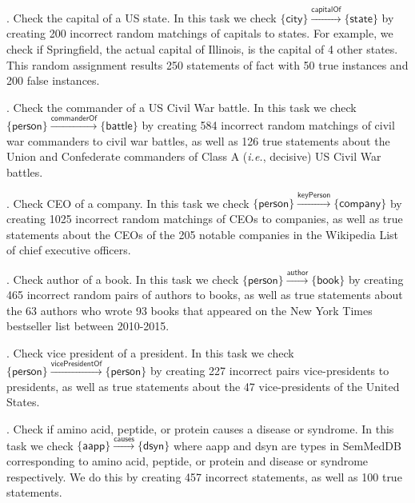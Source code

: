 \documentclass[reprint,twocolumn,showpacs,preprintnumbers,amsmath, aps,pre,amssymb]{revtex4-1}
\newcommand\ie{\emph{i.e.}}
\begin{document}
\vspace{5pt}. Check the capital of a US state. In this task we check $\{\textsf{city}\}\xrightarrow{\textsf{capitalOf}}\{\textsf{state}\}$ by creating 200 incorrect random matchings of capitals to states. For example, we check if Springfield, the actual capital of Illinois, is the capital of 4 other states. This random assignment results 250 statements of fact with 50 true instances and 200 false instances.

\vspace{5pt}. Check the commander of a US Civil War battle. In this task we check $\{\textsf{person}\}\xrightarrow{\textsf{commanderOf}}\{\textsf{battle}\}$ by creating 584 incorrect random matchings of civil war commanders to civil war battles, as well as 126 true statements about the Union and Confederate commanders of Class A (\ie, decisive) US Civil War battles. 

\vspace{5pt}. Check CEO of a company. In this task we check $\{\textsf{person}\}\xrightarrow{\textsf{keyPerson}}\{\textsf{company}\}$ by creating 1025 incorrect random matchings of CEOs to companies, as well as true statements about the CEOs of the 205 notable companies in the Wikipedia \textsf{List of chief executive officers}. 

\vspace{5pt}. Check author of a book. In this task we check $\{\textsf{person}\}\xrightarrow{\textsf{author}}\{\textsf{book}\}$ by creating 465 incorrect random pairs of authors to books, as well as true statements about the 63 authors who wrote 93 books that appeared on the New York Times bestseller list between 2010-2015.

\vspace{5pt}. Check vice president of a president. In this task we check $\{\textsf{person}\}\xrightarrow{\textsf{vicePresidentOf}}\{\textsf{person}\}$ by creating 227 incorrect pairs vice-presidents to presidents, as well as true statements about the 47 vice-presidents of the United States.

\vspace{5pt}. Check if amino acid, peptide, or protein causes a disease or syndrome. In this task we check $\{\textsf{aapp}\}\xrightarrow{\textsf{causes}}\{\textsf{dsyn}\}$ where \textsf{aapp} and \textsf{dsyn} are types in SemMedDB corresponding to amino acid, peptide, or protein and disease or syndrome respectively. We do this by creating 457 incorrect statements, as well as 100 true statements.
\end{document}

